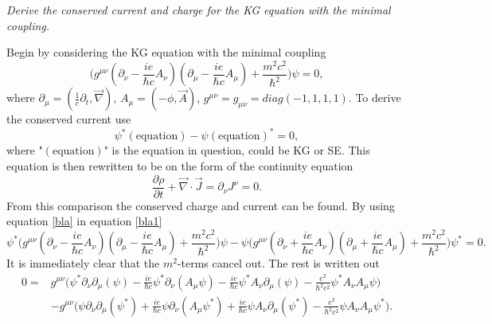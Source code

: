 \begin{example}
	\emph{Derive the conserved current and charge for the KG equation with the minimal coupling.}\newline
	
	Begin by considering the KG equation with the minimal coupling
	\begin{equation}
		\bigg(g^{\mu\nu}(\partial_{\nu}-\frac{ie}{\hbar c}A_{\nu})(\partial_{\mu}-\frac{ie}{\hbar c}A_{\mu})+\frac{m^2c^2}{\hbar^2}\bigg)\psi=0,
		\label{bla}
	\end{equation} 
	where $\partial_\mu=(\frac{1}{c}\partial_t,\vec{\nabla})$, $A_\mu=(-\phi,\vec{A})$, $g^{\mu\nu}=g_{\mu\nu}=diag(-1,1,1,1)$. To derive the conserved current use
	\begin{equation}
		\psi^*(\mbox{equation})-\psi(\mbox{equation})^*=0,
		\label{bla1}
	\end{equation} 
	where "$(\mbox{equation})$" is the equation in question, could be KG or SE. This equation is then rewritten to be on the form of the continuity equation
	\begin{equation}
		\frac{\partial \rho}{\partial t}+\vec{\nabla}\cdot\vec{J}=\partial_\nu J^\nu=0.
		\label{continuity}
	\end{equation} 
	From this comparison the conserved charge and current can be found. By using equation \ref{bla} in equation \ref{bla1}
	\begin{equation}
		\psi^*\bigg(g^{\mu\nu}(\partial_{\nu}-\frac{ie}{\hbar c}A_{\nu})(\partial_{\mu}-\frac{ie}{\hbar c}A_{\mu})+\frac{m^2c^2}{\hbar^2}\bigg)\psi-\psi\bigg(g^{\mu\nu}(\partial_{\nu}+\frac{ie}{\hbar c}A_{\nu})(\partial_{\mu}+\frac{ie}{\hbar c}A_{\mu})+\frac{m^2c^2}{\hbar^2}\bigg)\psi^*=0.
	\end{equation} 
	It is immediately clear that the $m^2$-terms cancel out. The rest is written out
	\begin{equation}
		\begin{split}
			0=&g^{\mu\nu}\bigg(\psi^*\partial_\nu\partial_\mu(\psi)-\frac{ie}{\hbar c}\psi^*\partial_\nu(A_\mu\psi)-\frac{ie}{\hbar c}\psi^*A_\nu\partial_\mu(\psi)-\frac{e^2}{\hbar^2c^2}\psi^*A_{\nu}A_{\mu}\psi\bigg)\\
			&-g^{\mu\nu}\bigg(\psi\partial_\nu\partial_\mu(\psi^*)+\frac{ie}{\hbar c}\psi\partial_\nu(A_\mu\psi^*)+\frac{ie}{\hbar c}\psi A_\nu\partial_\mu(\psi^*)-\frac{e^2}{\hbar^2c^2}\psi A_{\nu}A_{\mu}\psi^*\bigg).
		\end{split}

\end{equation}
\end{example}

